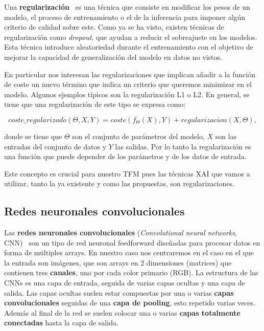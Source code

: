 Una \textbf{regularización}~\cite{XSHIELD, Regularization} es una técnica que consiste en modificar los pesos de un modelo, el proceso de entrenamiento o el de la inferencia para imponer algún criterio de calidad sobre este. Como ya se ha visto, existen técnicas de regularización como \textit{dropout}, que ayudan a reducir el sobreajuste en los modelos. Esta técnica introduce aleatoriedad durante el entrenamiento con el objetivo de mejorar la capacidad de generalización del modelo en datos no vistos.

En particular nos interesan las regularizaciones que implican añadir a la función de coste un nuevo término que indica un criterio que queremos minimizar en el modelo. Algunos ejemplos típicos son la regularización L1 o L2. En general, se tiene que una regularización de este tipo se expresa como:

\begin{equation}
coste\_regularizado(\Theta, X, Y) = coste(f_\Theta (X), Y) + regularizacion(X,\Theta ),
\end{equation}

donde se tiene que $\Theta$ son el conjunto de parámetros del modelo, $X$ son las entradas del conjunto de datos y $Y$ las salidas. Por lo tanto la regularización es una función que puede depender de los parámetros y de los datos de entrada. 

Este concepto es crucial para nuestro TFM pues las técnicas XAI que vamos a utilizar, tanto la ya existente y como las propuestas, son regularizaciones.


\subsection{Redes neuronales convolucionales}
Las \textbf{redes neuronales convolucionales} (\textit{Convolutional neural networks}, CNN)~\cite{9451544} son un tipo de red neuronal feedforward diseñadas para procesar datos en forma de múltiples arrays. En nuestro caso nos centraremos en el caso en el que la entrada son imágenes, que son arrays en 2 dimensiones (matrices) que contienen tres \textbf{canales}, uno por cada color primario (RGB).  La estructura de las CNNs es una capa de entrada, seguida de varias capas ocultas y una capa de salida. Las capas ocultas suelen estar compuestas por una o varias \textbf{capas convolucionales} seguidas de una \textbf{capa de pooling}, esto repetido varias veces. Además al final de la red se suelen colocar una o varias \textbf{capas totalmente conectadas} hasta la capa de salida.

